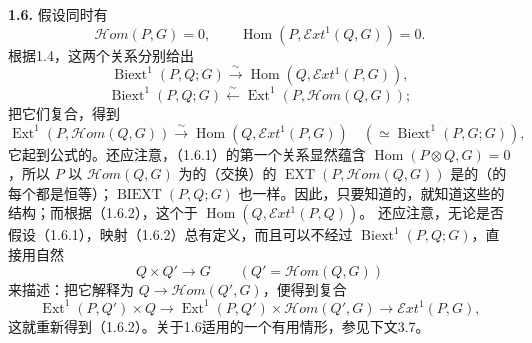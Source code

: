 \textbf{1.6.} 假设同时有
\[\mathcal Hom(P,G)=0,\qquad\operatorname{Hom}(P,\mathcal Ext^1(Q,G))=0.\tag{1.6.1}\]
根据1.4，这两个关系分别给出
\[\operatorname{Biext}^1(P,Q;G)\xrightarrow{\sim}\operatorname{Hom}(Q,\mathcal Ext^1(P,G)),\]
\[\operatorname{Biext}^1(P,Q;G)\xleftarrow{\sim}\operatorname{Ext}^1(P,\mathcal Hom(Q,G));\]
把它们复合，得到
\[\operatorname{Ext}^1(P,\mathcal Hom(Q,G))\xrightarrow{\sim}
\operatorname{Hom}(Q,\mathcal Ext^1(P,G))\quad(\simeq\operatorname{Biext}^1(P,G;G)),\tag{1.6.2}\]
它起到公式的。还应注意，（1.6.1）的第一个关系显然蕴含 $\operatorname{Hom}(P\otimes Q,G)=0$，所以 $P$ 以 $\mathcal Hom(Q,G)$ 为的（交换）的 $\operatorname{EXT}(P,\mathcal Hom(Q,G))$ 是的（的每个都是恒等）；$\operatorname{BIEXT}(P,Q;G)$ 也一样。因此，只要知道的，就知道这些的结构；而根据（1.6.2），这个于 $\operatorname{Hom}(Q,\mathcal Ext^1(P,Q))$。
还应注意，无论是否假设（1.6.1），映射（1.6.2）总有定义，而且可以不经过 $\operatorname{Biext}^1(P,Q;G)$，直接用自然
\[Q\times Q'\longrightarrow G\qquad(Q'=\mathcal Hom(Q,G))\]
来描述：把它解释为 $Q\longrightarrow\mathcal Hom(Q',G)$，便得到复合
\[\operatorname{Ext}^1(P,Q')\times Q\longrightarrow
\operatorname{Ext}^1(P,Q')\times\mathcal Hom(Q',G)\longrightarrow\mathcal Ext^1(P,G),\tag{1.6.3}\]
这就重新得到（1.6.2）。关于1.6适用的一个有用情形，参见下文3.7。

